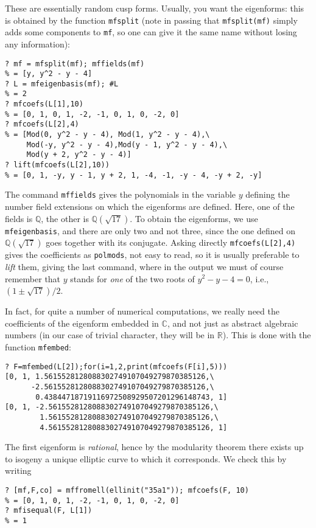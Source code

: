 \documentclass[11pt]{article}
\newcommand{\Q}{{\mathbb Q}}
\newcommand{\R}{{\mathbb R}}
\newcommand{\C}{{\mathbb C}}
\def\kbd#1{{\tt #1}}
\begin{document}
These are essentially random cusp forms. Usually, you want the eigenforms:
this is obtained by the function \kbd{mfsplit} (note in passing that
\kbd{mfsplit(mf)} simply adds some components to \kbd{mf}, so one can
give it the same name without losing any information):

\begin{verbatim}
? mf = mfsplit(mf); mffields(mf)
% = [y, y^2 - y - 4]
? L = mfeigenbasis(mf); #L
% = 2
? mfcoefs(L[1],10)
% = [0, 1, 0, 1, -2, -1, 0, 1, 0, -2, 0]
? mfcoefs(L[2],4)
% = [Mod(0, y^2 - y - 4), Mod(1, y^2 - y - 4),\
     Mod(-y, y^2 - y - 4),Mod(y - 1, y^2 - y - 4),\
     Mod(y + 2, y^2 - y - 4)]
? lift(mfcoefs(L[2],10))
% = [0, 1, -y, y - 1, y + 2, 1, -4, -1, -y - 4, -y + 2, -y]
\end{verbatim}

The command \kbd{mffields} gives the polynomials in the variable $y$ defining
the number field extensions on which
the eigenforms are defined. Here, one of the fields is $\Q$, the other is
$\Q(\sqrt{17})$. To obtain the eigenforms, we use \kbd{mfeigenbasis}, and
there are only two and not three, since the one defined on $\Q(\sqrt{17})$
goes together with its conjugate. Asking directly \kbd{mfcoefs(L[2],4)} gives
the coefficients as \kbd{polmods}, not easy to read, so it is usually
preferable to \emph{lift} them, giving the last command, where in the output
we must of course remember that $y$ stands for \emph{one} of the two roots
of $y^2-y-4=0$, i.e., $(1\pm\sqrt{17})/2$.

In fact, for quite a number of numerical computations, we really need the
coefficients of the eigenform embedded in $\C$, and not just as abstract
algebraic numbers (in our case of trivial character, they will be in $\R$).
This is done with the function \kbd{mfembed}:

\begin{verbatim}
? F=mfembed(L[2]);for(i=1,2,print(mfcoefs(F[i],5)))
[0, 1, 1.5615528128088302749107049279870385126,\
      -2.5615528128088302749107049279870385126,\
       0.43844718719116972508929507201296148743, 1]
[0, 1, -2.5615528128088302749107049279870385126,\
        1.5615528128088302749107049279870385126,\
        4.5615528128088302749107049279870385126, 1]
\end{verbatim}

The first eigenform is \emph{rational}, hence by the modularity theorem there
exists up to isogeny a unique elliptic curve to which it corresponds.
We check this by writing

\begin{verbatim}
? [mf,F,co] = mffromell(ellinit("35a1")); mfcoefs(F, 10)
% = [0, 1, 0, 1, -2, -1, 0, 1, 0, -2, 0]
? mfisequal(F, L[1])
% = 1
\end{verbatim}
\end{document}
